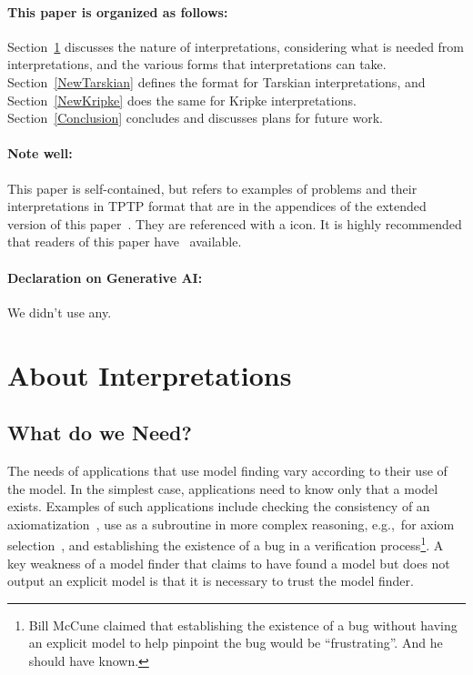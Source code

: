 \documentclass{ceurart}
\newcommand{\example}{{\scriptsize \faFile[regular]}}
\begin{document}
\paragraph{This paper is organized as follows:}
Section~\ref{Interpretations} discusses the nature of interpretations, considering what is
needed from interpretations, and the various forms that interpretations can take.
Section~\ref{NewTarskian} defines the format for Tarskian interpretations, and
Section~\ref{NewKripke} does the same for Kripke interpretations.
Section~\ref{Conclusion} concludes and discusses plans for future work.

\paragraph{Note well:} 
This paper is self-contained, but refers to examples of problems and their interpretations in 
TPTP format that are in the appendices of the extended version of this paper~\cite{SS+26-arXiv}.
They are referenced with a \example{} icon.
It is highly recommended that readers of this paper have~\cite{SS+26-arXiv} available.

\paragraph{Declaration on Generative AI:}
We didn't use any.

\section{About Interpretations}
\label{Interpretations}

\subsection{What do we Need?}
\label{Need}

The needs of applications that use model finding vary according to their use of the model.
In the simplest case, applications need to know only that a model exists.
Examples of such applications include checking the consistency of an axiomatization~\cite{CI15},
use as a subroutine in more complex reasoning, e.g.,~for
axiom selection~\cite{SP07,Pud07-ESARLT}, and establishing the existence of a bug in a
verification process\footnote{%
Bill McCune claimed that establishing the existence of a bug without having an explicit model
to help pinpoint the bug would be ``frustrating''. And he should have known.}.
A key weakness of a model finder that claims to have found a model but does not output an 
explicit model is that it is necessary to trust the model finder.
\end{document}
